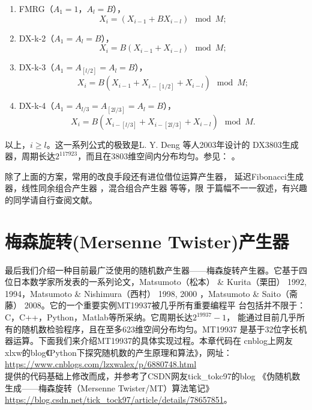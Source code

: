\begin{enumerate}
\item FMRG（$A_1 = 1$，$A_l = B$），
  \begin{equation}
    X_i = (X_{i - 1} + B X_{i - l}) \mod M;
    \label{eq::fmrg}
  \end{equation}
\item DX-k-2（$A_1 = A_l = B$），
  \begin{equation}
    X_i = B(X_{i - 1} + X_{i - l}) \mod M;
    \label{eq::dxk2}
  \end{equation}
\item DX-k-3（$A_1 = A_{[l / 2]} = A_l = B$），
  \begin{equation}
    X_i = B(X_{i - 1} + X_{i -[1 / 2]} + X_{i - l}) \mod M;
    \label{eq::dxk3}
  \end{equation}
\item DX-k-4（$A_1 = A_{l / 3} = A_{[2l /3]} = A_l = B$），
  \begin{equation}
    X_i = B(X_{i - [l /3]} + X_{i - [2l /3]} + X_{i - l}) \mod M.
  \end{equation}
\end{enumerate}
以上，$i \geq l$。这一系列公式的极致是L. Y. Deng 等人2003年设计的
DX3803生成器，周期长达$2^{117923}$，而且在3803维空间内分布均匀。参见：
\cite{Deng2003A}。

除了上面的方案，常用的改良手段还有进位借位运算产生器\cite{Shu1993On}，
延迟Fibonacci生成器\cite{Brent1992Uniform}，线性同余组合产生器
\cite{L1991Structural, Rose2014KISS}，混合组合产生器
\cite{Fischer1999Good, Marsaglia2004The, Marsaglia1990Toward}等等，限
于篇幅不一一叙述，有兴趣的同学请自行查阅文献。

\section{梅森旋转(Mersenne Twister)产生器}

最后我们介绍一种目前最广泛使用的随机数产生器——梅森旋转产生器。它基于四
位日本数学家所发表的一系列论文，Matsumoto（松本） \& Kurita（栗田）
1992, 1994\cite{Matsumoto1992Twisted, Matsumoto1994Twisted}，Matsumoto
\& Nishimura（西村） 1998, 2000
\cite{Matsumoto2000Dynamic, Matsumoto1998Mersenne}，Matsumoto \& Saito（斋藤）
2008\cite{Saito2008SIMD}。它的一个重要实例MT19937被几乎所有重要编程平
台包括并不限于：C，C++，Python，Matlab等所采纳。它周期长达$2^{19937}-1$，
能通过目前几乎所有的随机数检验程序，且在至多623维空间分布均匀。MT19937
是基于32位字长机器运算。下面我们来介绍MT19937的具体实现过程。本章代码在
cnblog上网友xlxw的blog《Python下探究随机数的产生原理和算法》，网址：\\
\href{https://www.cnblogs.com/lzxwalex/p/6880748.html}
     {https://www.cnblogs.com/lzxwalex/p/6880748.html} \\
提供的代码基础上修改而成，并参考了CSDN网友tick\_tokc97的blog
《伪随机数生成——梅森旋转（Mersenne Twister/MT）算法笔记》\\
\href{https://blog.csdn.net/tick_tock97/article/details/78657851}
     {https://blog.csdn.net/tick\_tock97/article/details/78657851}。


